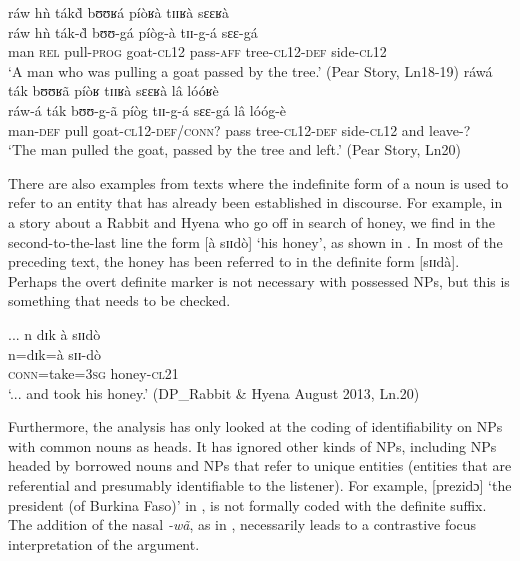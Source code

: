 \documentclass[output=paper]{langsci/langscibook}
\begin{document}
\ea\label{ex:teo:57}
ráw hǹ ták\`{d} bʊʊʁá píòʁà tɪɪʁà sɛɛʁà\\
\gll ráw hǹ ták-\`{d} bʊʊ-gá píòg-à tɪɪ-g-á sɛɛ-gá\\
man \textsc{rel} pull-\textsc{prog} goat-\textsc{cl12} pass-\textsc{aff} tree\textsc{-cl12-def} side\textsc{-cl12}{\rmfnm}\\
\glt ‘A man who was pulling a goat passed by the tree.’ (Pear Story, Ln18-19)
\z
{}
\ea\label{ex:teo:58}
ráwá ták bʊʊʁã píòʁ tɪɪʁà sɛɛʁà lâ lóóʁè\\
\gll ráw-á ták bʊʊ-g-ã píòg tɪɪ-g-á sɛɛ-gá lâ lóóg-è\\ 
man-\textsc{def} pull goat-\textsc{cl12-}\textsc{def/conn?} pass tree\textsc{-cl12-def} side\textsc{-cl12} and leave-?\\
\glt ‘The man pulled the goat, passed by the tree and left.’ (Pear Story, Ln20)
\z

There are also examples from texts where the indefinite form of a noun is used to refer to an entity that has already been established in discourse. For example, in a story about a Rabbit and Hyena who go off in search of honey, we find in the second-to-the-last line the form [à sɪɪdò] ‘his honey’, as shown in . In most of the preceding text, the honey has been referred to in the definite form [sɪɪdà]. Perhaps the overt definite marker is not necessary with possessed NPs, but this is something that needs to be checked. 


\ea\label{ex:teo:59}
... n dɪk à sɪɪdò\\
 n=dɪk=à sɪɪ-dò\\
{}  \textsc{conn}=take=\textsc{3sg} honey-\textsc{cl21}\\
\glt ‘... and took his honey.’ (DP\_Rabbit \& Hyena August 2013, Ln.20)
\z

Furthermore, the analysis has only looked at the coding of identifiability on NPs with common nouns as heads. It has ignored other kinds of NPs, including NPs headed by borrowed nouns and NPs that refer to unique entities (entities that are referential and presumably identifiable to the listener). For example, [prezidɔ] ‘the president (of Burkina Faso)’ in , is not formally coded with the definite suffix. The addition of the nasal \textit{-wã}, as in , necessarily leads to a contrastive focus interpretation of the argument.
\end{document}
